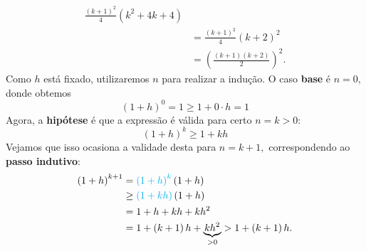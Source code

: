 \documentclass[12pt, a4paper]{article}
\newcommand{\negrito}[1]{\mbox{\boldmath{$#1$}}}
\newcommand{\alt}[1]{\textcolor{Floresta}{$\negrito{(#1)} $}}
\begin{document}
\begin{solution}
{\begin{align*}
\frac{ \left( k+1 \right) ^{2}}{4} \left( k^{2}+4k+4 \right)\\& =\frac{ \left( k+1 \right) ^{2}}{4} \left( k+2 \right) ^{2}\\&= \left( \frac{ \left( k+1 \right)  \left( k+2 \right) }{2} \right) ^{2}.
\end{align*}
\task[\alt{c}] Como $h$ está fixado, utilizaremos $n$ para realizar a indução. O caso \textbf{base} é $n = 0,$ donde obtemos
$$\left( 1+h \right) ^{0}=1 \geq 1+0\cdot h=1$$
Agora, a \textbf{hipótese} é que a expressão é válida para certo $n = k > 0:$
$$\left( 1+h \right) ^{k} \geq 1+kh$$
Vejamos que isso ocasiona a validade desta para $n = k + 1,$ correspondendo ao \textbf{passo indutivo}:
\begin{align*}\left( 1+h \right) ^{k+1}&= \textcolor{Cyan}{\left( 1+h \right) ^{k}} \left( 1+h \right)
\\&\geq  \textcolor{Cyan}{\left( 1+kh \right)}  \left( 1+h \right) \\&=1+h+kh+kh^{2}\\&=
1+ \left( k+1 \right) h+\underbrace{kh^{2}}_{>0}>1+ \left( k+1 \right)h.
\end{align*}
}
\end{solution}
\end{document}
